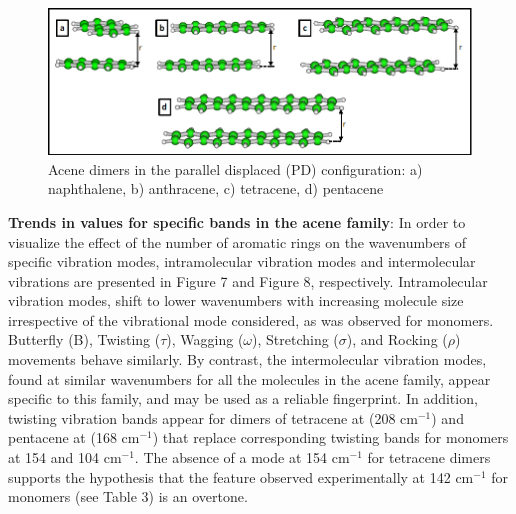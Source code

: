 \begin{figure}[h]
	\centering
	\includegraphics[scale=0.55]{image/acene-dimers}
	\caption[Acene dimers in the parallel displaced configuration]{Acene dimers in the parallel displaced (PD) configuration: a) naphthalene, b) anthracene, c) tetracene, d) pentacene}
\end{figure}

\textbf{Trends in values for specific bands in the acene family}: In order to visualize the effect of the number of aromatic rings on the wavenumbers of specific vibration modes, intramolecular vibration modes and intermolecular vibrations are presented in Figure 7 and Figure 8, respectively. Intramolecular vibration modes, shift to lower wavenumbers with increasing molecule size irrespective of the vibrational mode considered, as was observed for monomers. Butterfly (B), Twisting ($\tau$), Wagging ($\omega$), Stretching ($\sigma$), and Rocking ($\rho$) movements behave similarly. By contrast, the intermolecular vibration modes, found at similar wavenumbers for all the molecules in the acene family, appear specific to this family, and may be used as a reliable fingerprint. In addition, twisting vibration bands appear for dimers of tetracene at (208 cm$^{-1}$) and pentacene at (168 cm$^{-1}$) that replace corresponding twisting bands for monomers at 154 and 104 cm$^{-1}$. The absence of a mode at 154 cm$^{-1}$ for tetracene dimers supports the hypothesis that the feature observed experimentally at 142 cm$^{-1}$ for monomers (see Table 3) is an overtone.

